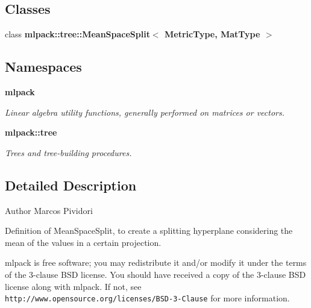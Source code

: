 \subsection*{Classes}
\begin{DoxyCompactItemize}
\item 
class {\bf mlpack\+::tree\+::\+Mean\+Space\+Split$<$ Metric\+Type, Mat\+Type $>$}
\end{DoxyCompactItemize}
\subsection*{Namespaces}
\begin{DoxyCompactItemize}
\item 
 {\bf mlpack}
\begin{DoxyCompactList}\small\item\em Linear algebra utility functions, generally performed on matrices or vectors. \end{DoxyCompactList}\item 
 {\bf mlpack\+::tree}
\begin{DoxyCompactList}\small\item\em Trees and tree-\/building procedures. \end{DoxyCompactList}\end{DoxyCompactItemize}


\subsection{Detailed Description}
\begin{DoxyAuthor}{Author}
Marcos Pividori
\end{DoxyAuthor}
Definition of Mean\+Space\+Split, to create a splitting hyperplane considering the mean of the values in a certain projection.

mlpack is free software; you may redistribute it and/or modify it under the terms of the 3-\/clause B\+SD license. You should have received a copy of the 3-\/clause B\+SD license along with mlpack. If not, see {\tt http\+://www.\+opensource.\+org/licenses/\+B\+S\+D-\/3-\/\+Clause} for more information. 